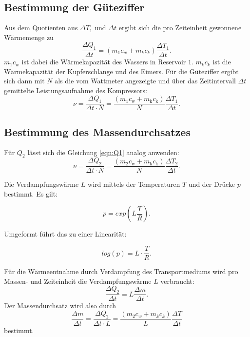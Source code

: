 \subsection{Bestimmung der Güteziffer}
Aus dem Quotienten aus $\Delta T_1$ und $\Delta t$ ergibt sich die pro Zeiteinheit 
gewonnene Wärmemenge zu
\begin{equation*}
    \frac{\Delta Q_1}{\Delta t} = (m_1 c_w + m_k c_k)\frac{\Delta T_1}{\Delta t}.
    \label{eqn:Q1}
\end{equation*}
$m_1 c_w$ ist dabei die Wärmekapazität des Wassers in Reservoir $\num{1}$. $m_k c_k$ ist die 
Wärmekapazität der Kupferschlange und des Eimers. Für die Güteziffer ergibt sich dann 
mit $N$ als die vom Wattmeter angezeigte und über das Zeitintervall $\Delta t$ 
gemittelte Leistungsaufnahme des Kompressors:
\begin{equation}
    \nu = \frac{\Delta Q_1}{\Delta t \cdot N} = \frac{(m_1 c_\text{w} + m_\text{k} c_\text{k})}{N} \frac{\Delta T_1}{\Delta t}.
    \label{eqn:güteziffer}
\end{equation}

\subsection{Bestimmung des Massendurchsatzes}
Für $Q_2$ lässt sich die Gleichung \ref{eqn:Q1} analog anwenden:
\begin{equation*}
    \nu = \frac{\Delta Q_2}{\Delta t \cdot N} = \frac{(m_2 c_\text{w} + m_\text{k} c_\text{k})}{N} \frac{\Delta T_2}{\Delta t}.
\end{equation*}

Die Verdampfungswärme $L$ wird mittels der Temperaturen $T$ und der Drücke $p$ bestimmt.
Es gilt: 

\begin{equation}
    p = exp \left(L \frac{T}{R} \right).
    \label{eqn:L}
\end{equation}

Umgeformt führt das zu einer Linearität:

\begin{equation}
    log(p) = L \cdot \frac{T}{R}.
    \label{eqn:Llinear}
\end{equation}

Für die Wärmeentnahme durch Verdampfung des Transportmediums
wird pro Massen- und Zeiteinheit die Verdampfungswärme $L$ 
verbraucht:
\begin{equation*}
    \frac{\Delta Q_2}{\Delta t} = L \frac{\Delta m}{\Delta t}.
\end{equation*}
Der Massendurchsatz wird also durch
\begin{equation}
    \frac{\Delta m}{\Delta t} = \frac{\Delta Q_2}{\Delta t \cdot L} = \frac{(m_2 c_w + m_k c_k)}{L} \frac{\Delta T}{\Delta t} %
    \label{eqn:massendurchsatz}
\end{equation}
bestimmt.

